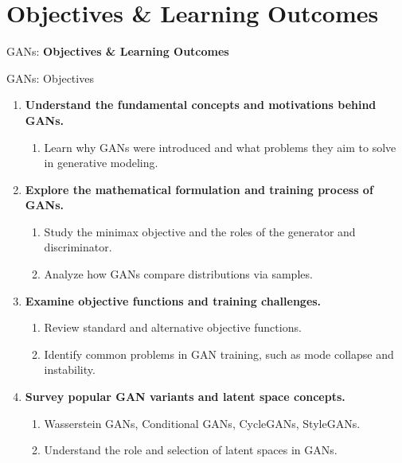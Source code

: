 \section{Objectives \& Learning Outcomes}
\begin{frame}{}
    \LARGE GANs: \textbf{Objectives \& Learning Outcomes}
\end{frame}

\begin{frame}[allowframebreaks]{GANs: Objectives}
    \begin{enumerate}
        \setlength{\itemsep}{-0.1em}
        \item \textbf{Understand the fundamental concepts and motivations behind GANs.}
        \begin{enumerate}
            \setlength{\itemsep}{-0.75em}
            \item Learn why GANs were introduced and what problems they aim to solve in generative modeling.
        \end{enumerate}
        \item \textbf{Explore the mathematical formulation and training process of GANs.}
        \begin{enumerate}
            \setlength{\itemsep}{-0.75em}
            \item Study the minimax objective and the roles of the generator and discriminator.
            \item Analyze how GANs compare distributions via samples.
        \end{enumerate}
        \item \textbf{Examine objective functions and training challenges.}
        \begin{enumerate}
            \setlength{\itemsep}{-0.75em}
            \item Review standard and alternative objective functions.
            \item Identify common problems in GAN training, such as mode collapse and instability.
        \end{enumerate}
        \item \textbf{Survey popular GAN variants and latent space concepts.}
        \begin{enumerate}
            \setlength{\itemsep}{-0.75em}
            \item Wasserstein GANs, Conditional GANs, CycleGANs, StyleGANs.
            \item Understand the role and selection of latent spaces in GANs.
        \end{enumerate}
    \end{enumerate}
\end{frame}


